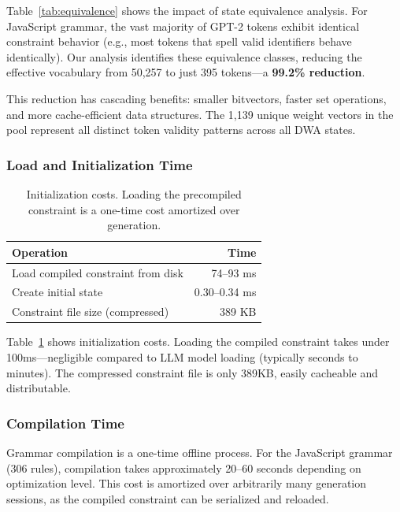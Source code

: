\documentclass[11pt,a4paper]{article}
\theoremstyle{plain}
\theoremstyle{definition}
\theoremstyle{remark}
\begin{document}
Table~\ref{tab:equivalence} shows the impact of state equivalence analysis. For JavaScript grammar, the vast majority of GPT-2 tokens exhibit identical constraint behavior (e.g., most tokens that spell valid identifiers behave identically). Our analysis identifies these equivalence classes, reducing the effective vocabulary from 50,257 to just 395 tokens---a \textbf{99.2\% reduction}.

This reduction has cascading benefits: smaller bitvectors, faster set operations, and more cache-efficient data structures. The 1,139 unique weight vectors in the pool represent all distinct token validity patterns across all DWA states.

\subsubsection{Load and Initialization Time}

\begin{table}[t]
\centering
\begin{tabular}{lr}
\toprule
\textbf{Operation} & \textbf{Time} \\
\midrule
Load compiled constraint from disk & 74--93 ms \\
Create initial state & 0.30--0.34 ms \\
\midrule
Constraint file size (compressed) & 389 KB \\
\bottomrule
\end{tabular}
\caption{Initialization costs. Loading the precompiled constraint is a one-time cost amortized over generation.}
\label{tab:init}
\end{table}

Table~\ref{tab:init} shows initialization costs. Loading the compiled constraint takes under 100ms---negligible compared to LLM model loading (typically seconds to minutes). The compressed constraint file is only 389KB, easily cacheable and distributable.

\subsubsection{Compilation Time}

Grammar compilation is a one-time offline process. For the JavaScript grammar (306 rules), compilation takes approximately 20--60 seconds depending on optimization level. This cost is amortized over arbitrarily many generation sessions, as the compiled constraint can be serialized and reloaded.
\end{document}
